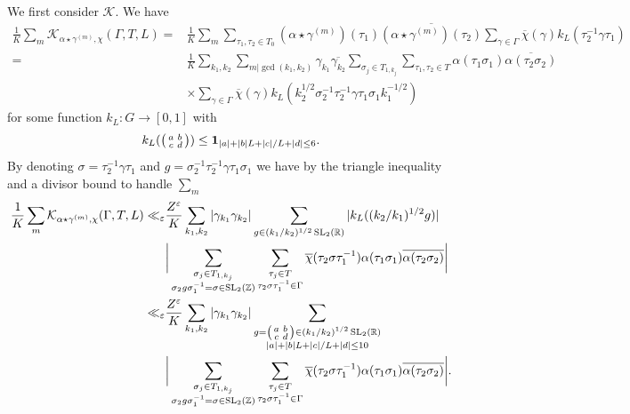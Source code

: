 \documentclass[12pt]{amsart}
\theoremstyle{definition}
\theoremstyle{remark}
\numberwithin{equation}{section}
\newcommand{\R}{{\mathbb R}}
\newcommand{\Z}{{\mathbb Z}}
\newcommand{\1}{{\mathbf 1}}
\newcommand{\eps}{\varepsilon}
\newcommand{\SL}{\operatorname{SL}_2}
\renewcommand{\c}{\mathfrak c}
\begin{document}
We first consider $\mathcal{K}$. We have 
\begin{align*}
   \frac{1}{K} \sum_m \mathcal{K}_{\alpha \star \gamma^{(m)},\chi}(\Gamma,T,L) = &  \frac{1}{K} \sum_m \sum_{\tau_1, \tau_2 \in T_0} (\alpha \star \gamma^{(m)})(\tau_1)  \overline{(\alpha \star \gamma^{(m)})(\tau_2)}\sum_{\gamma \in \Gamma} \overline{\chi}(\gamma) k_L(\tau_2^{-1} \gamma\tau_1  ) \\
   = &\frac{1}{K} \sum_{k_1,k_2} \sum_{m|\gcd(k_1,k_2)}\gamma_{k_1} \overline{\gamma_{k_2}} \sum_{\sigma_j \in T_{1,k_j}} \sum_{\tau_1, \tau_2 \in T} \alpha (\tau_1 \sigma_1)  \overline{\alpha(\tau_2 \sigma_2 )} \\
  &\times\sum_{\gamma \in \Gamma} \overline{\chi}(\gamma) k_L( k_2^{1/2} \sigma_{2}^{-1}\tau_2^{-1} \gamma\tau_1 \sigma_1  k_1^{-1/2})
\end{align*}
for some function $k_L:G \to [0,1]$ with 
\begin{align*}
k_L(\smqty(a & b \\ c& d)) \leq \mathbf{1}_{|a|+|b| L +|c|/L+|d| \leq 6}.
\end{align*}
By denoting $\sigma = \tau_2^{-1} \gamma \tau_1$ and $g= \sigma_{2}^{-1}\tau_2^{-1} \gamma\tau_1 \sigma_1$ we have by the triangle inequality and a divisor bound to handle $\sum_m$
\begin{align*}
     \frac{1}{K} \sum_m \mathcal{K}_{\alpha \star \gamma^{(m)},\chi}(\Gamma,T,L) \ll_\eps & \frac{Z^\eps}{K} \sum_{k_1,k_2} |\gamma_{k_1} \gamma_{k_2}| \sum_{g \in (k_1/k_2)^{1/2}\SL(\R)}   |k_L( (k_2/k_1)^{1/2} g )| \\
     &\bigg| \sum_{\substack{\sigma_j \in T_{1,k_j} \\ \sigma_2 g \sigma_1^{-1} = \sigma \in \SL(\Z) }}  \sum_{\substack{\tau_j \in T \\ \tau_2 \sigma  \tau_1^{-1} \in \Gamma }}  \overline{\chi}(\tau_2 \sigma \tau_1^{-1}) \alpha(\tau_1\sigma_1)\overline{\alpha(\tau_2\sigma_2)}\bigg| \\
     \ll_\eps & \frac{Z^\eps}{K} \sum_{k_1,k_2} |\gamma_{k_1} \gamma_{k_2}| \sum_{\substack{g = \smqty(a &b \\c& d) \in (k_1/k_2)^{1/2} \SL(\R) \\ |a| + |b|L + |c|/L +|d| \leq 10}}   \\
     &\bigg| \sum_{\substack{\sigma_j \in T_{1,k_j} \\ \sigma_2 g \sigma_1^{-1} = \sigma \in \SL(\Z) }}  \sum_{\substack{\tau_j \in T \\ \tau_2 \sigma  \tau_1^{-1} \in \Gamma }}  \overline{\chi}(\tau_2 \sigma \tau_1^{-1}) \alpha(\tau_1\sigma_1)\overline{\alpha(\tau_2\sigma_2)}\bigg| .
\end{align*}
\end{document}
